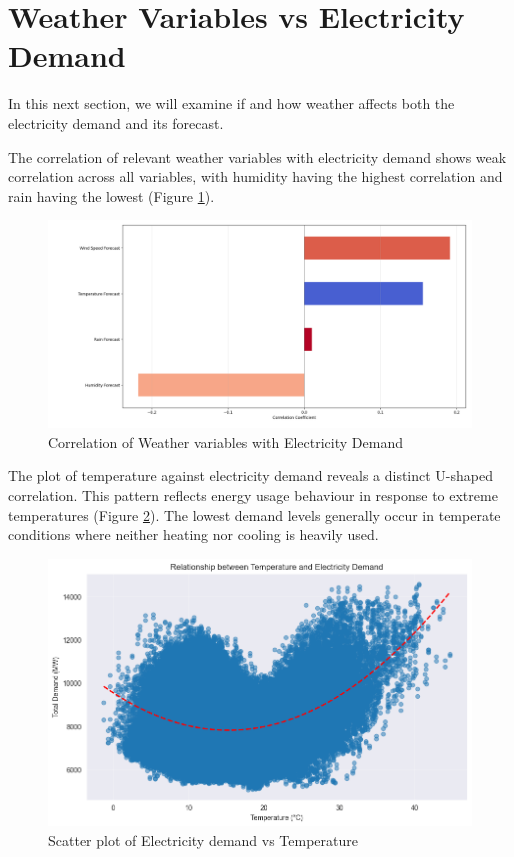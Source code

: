 \documentclass[mstat,12pt]{unswthesis}
\begin{document}
\section{Weather Variables vs Electricity Demand}\label{weather-variables-vs-electricity-demand}

In this next section, we will examine if and how weather affects both the electricity demand and its forecast.

\bigskip

The correlation of relevant weather variables with electricity demand shows weak correlation across all variables, with humidity having the highest correlation and rain having the lowest (Figure \ref{fig:weatherdemand}).

\begin{figure}
\includegraphics[width=1\linewidth,height=0.3\textheight]{images/WeatherVDemand} \caption{Correlation of Weather variables with Electricity Demand}\label{fig:weatherdemand}
\end{figure}

The plot of temperature against electricity demand reveals a distinct U-shaped correlation. This pattern reflects energy usage behaviour in response to extreme temperatures (Figure \ref{fig:tempcorr}). The lowest demand levels generally occur in temperate conditions where neither heating nor cooling is heavily used.

\begin{figure}
\includegraphics[width=1\linewidth,height=0.35\textheight]{images/tempvsdemand} \caption{Scatter plot of Electricity demand vs Temperature}\label{fig:tempcorr}
\end{figure}
\end{document}
